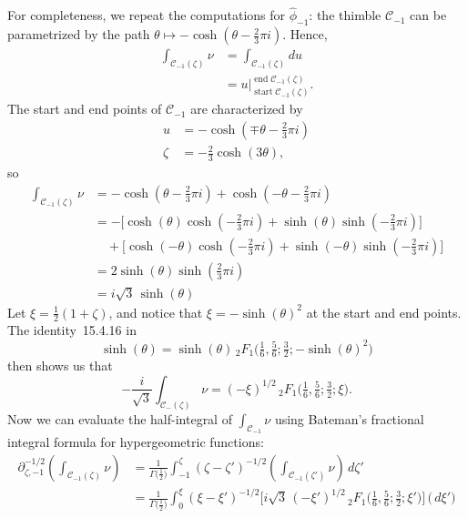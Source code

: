 \documentclass{article}
\newcommand{\fracderiv}[3]{\partial^{#1}_{#2, #3}}
\theoremstyle{definition}
\theoremstyle{plain}
\newenvironment{old}{\color{RoyalBlue}}{\color{black}}
\begin{document}
\begin{old}
%
For completeness, we repeat the computations for $\hat{\phi}_{-1}$: the thimble $\mathcal{C}_{-1}$ can be parametrized by the path $\theta \mapsto -\cosh(\theta - \tfrac{2}{3}\pi i)$. Hence,
\begin{align*}
\int_{\mathcal{C}_{-1}(\zeta)} \nu & = \int_{\mathcal{C}_{-1}(\zeta)} du \\
& = u \Big|_{\operatorname{start} \mathcal{C}_{-1}(\zeta)}^{\operatorname{end}\mathcal{C}_{-1}(\zeta)}.
\end{align*}
The start and end points of $\mathcal{C}_{-1}$ are characterized by
\begin{align*}
u & = -\cosh(\mp\theta - \tfrac{2}{3}\pi i) \\
\zeta & = -\tfrac{2}{3} \cosh(3\theta),
\end{align*}
so
\begin{align*}
\int_{\mathcal{C}_{-1}(\zeta)} \nu & =- \cosh(\theta - \tfrac{2}{3}\pi i) + \cosh(-\theta - \tfrac{2}{3}\pi i) \\
& =- \big[\cosh(\theta) \cosh(-\tfrac{2}{3}\pi i) + \sinh(\theta) \sinh(-\tfrac{2}{3}\pi i)\big] \\
& \quad + \big[\cosh(-\theta) \cosh(-\tfrac{2}{3}\pi i) + \sinh(-\theta) \sinh(-\tfrac{2}{3}\pi i)\big] \\
& = 2\sinh(\theta) \sinh(\tfrac{2}{3}\pi i) \\
& = i\sqrt{3}\,\sinh(\theta)
\end{align*}
Let $\xi = \tfrac{1}{2}(1 + \zeta)$, and notice that $\xi =- \sinh( \theta)^2$ at the start and end points. The identity~15.4.16 in \cite{dlmf}
\[ \sinh(\theta) = \sinh(\theta)\, {}_2F_1\big(\tfrac{1}{6}, \tfrac{5}{6}; \tfrac{3}{2}; -\sinh(\theta)^2\big) \]
then shows us that
\[ -\frac{i}{\sqrt{3}} \int_{\mathcal{C}_-(\zeta)} \nu =  (-\xi)^{1/2}\, {}_2F_1\big(\tfrac{1}{6}, \tfrac{5}{6}; \tfrac{3}{2}; \xi\big). \]
Now we can evaluate the half-integral of $\int_{\mathcal{C}_{-1}} \nu$ using Bateman's fractional integral formula for hypergeometric functions: \begin{align*}
\fracderiv{-1/2}{\zeta}{-1}\left( \int_{\mathcal{C}_{-1}(\zeta)} \nu \right) & = \frac{1}{\Gamma\big(\tfrac{1}{2}\big)} \int_{-1}^\zeta (\zeta - \zeta')^{-1/2} \left( \int_{\mathcal{C}_{-1}(\zeta')} \nu \right)\,d\zeta' \\
& = \frac{1}{\Gamma\big(\tfrac{1}{2}\big)} \int_0^\xi  (\xi - \xi')^{-1/2} \Big[{i}{\sqrt{3}}\, (-\xi')^{1/2}\, {}_2F_1\big(\tfrac{1}{6}, \tfrac{5}{6}; \tfrac{3}{2}; \xi' \big) \Big] \,\big( \,d\xi' \big) \\

\end{align*}
\end{old}
\end{document}
